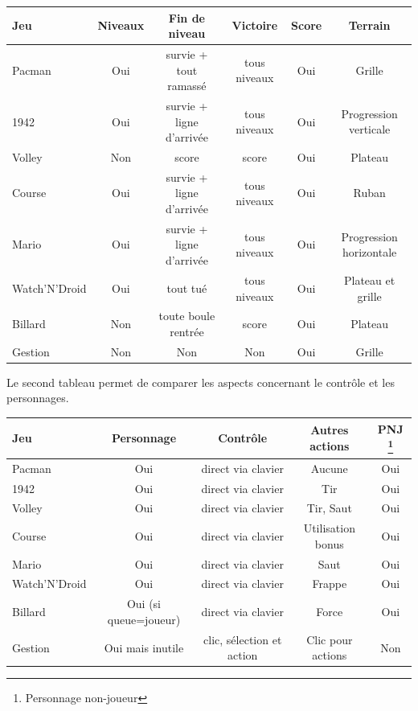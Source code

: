 \vspace{0.5cm}
\noindent
\begin{center}
\begin{tabular}{|l|| c|c|c|c|c|}
\hline
 Jeu &  Niveaux & Fin de niveau & Victoire & Score & Terrain \\
\hline
 Pacman & Oui & survie + tout ramassé & tous niveaux & Oui & Grille \\
\hline
 1942 & Oui & survie + ligne d'arrivée & tous niveaux & Oui & Progression verticale \\
\hline
 Volley &  Non & score & score & Oui & Plateau \\
\hline
 Course & Oui & survie + ligne d'arrivée & tous niveaux & Oui & Ruban \\
\hline
 Mario & Oui & survie + ligne d'arrivée & tous niveaux & Oui & Progression horizontale\\
\hline
 Watch'N'Droid & Oui & tout tué & tous niveaux & Oui  & Plateau et grille\\
\hline
 Billard & Non & toute boule rentrée & score & Oui & Plateau \\
\hline
 Gestion & Non & Non & Non & Oui & Grille\\
\hline
\end{tabular}
\end{center}



Le second tableau permet de comparer les aspects concernant le contrôle et les personnages.

\vspace{0.5cm}
\noindent
\begin{tabular}{|l|| c|c|c|c|}
\hline
 Jeu & Personnage & Contrôle & Autres actions & PNJ \footnote{Personnage non-joueur} \\
\hline
 Pacman &  Oui & direct via clavier & Aucune &  Oui \\
\hline
 1942 & Oui & direct via clavier & Tir & Oui  \\
\hline
 Volley & Oui & direct via clavier  & Tir, Saut & Oui \\
\hline
 Course & Oui & direct via clavier & Utilisation bonus & Oui \\
\hline
 Mario & Oui & direct via clavier &  Saut & Oui \\
\hline
 Watch'N'Droid & Oui & direct via clavier & Frappe & Oui  \\
\hline 
 Billard &  Oui {\small (si queue=joueur)} & direct via clavier & Force & Oui  \\
\hline
 Gestion &  Oui mais inutile & clic, sélection et action & Clic pour actions & Non \\
\hline
\end{tabular}

